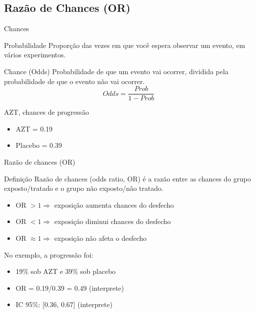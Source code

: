 \documentclass{beamer}
\begin{document}
\subsection{Razão de Chances (OR)}

\begin{frame}{\scriptsize Chances}
  \begin{block}{Probabilidade}
    \footnotesize
    Proporção das vezes em que você espera observar um evento, em vários experimentos.
  \end{block}
  \begin{block}{Chance (Odds)}
    \footnotesize
    Probabilidade de que um evento vai ocorrer, dividida pela probabilidade de que o evento não vai ocorrer.
    \begin{displaymath}
      Odds = \frac{Prob}{1- Prob}
    \end{displaymath}
  \end{block}
  \begin{exampleblock}{AZT, chances de progressão}
    \footnotesize
    \begin{itemize}
      \footnotesize
    \item AZT = 0.19
    \item Placebo = 0.39
    \end{itemize}
  \end{exampleblock}
\end{frame}

\begin{frame}{\scriptsize Razão de chances (OR)}
  \begin{block}{Definição}
    \footnotesize
    Razão de chances (odds ratio, OR) é a razão entre as chances do grupo exposto/tratado e o grupo não exposto/não tratado.
  \end{block}
  \begin{itemize}
    \footnotesize
  \item OR $> 1 \Rightarrow$ exposição aumenta chances do desfecho
  \item OR $< 1 \Rightarrow$ exposição diminui chances do desfecho
  \item OR $\approx 1 \Rightarrow$ exposição não afeta o desfecho
  \end{itemize}
  \begin{exampleblock}{No exemplo, a progressão foi:}
    \footnotesize
    \begin{itemize}
      \footnotesize
    \item 19\% sob AZT e 39\% sob placebo
    \item OR = 0.19/0.39 = 0.49 (interprete)
    \item<2-> IC 95\%: [0.36, 0.67] (interprete)
    \end{itemize}
  \end{exampleblock}
\end{frame}
\end{document}
